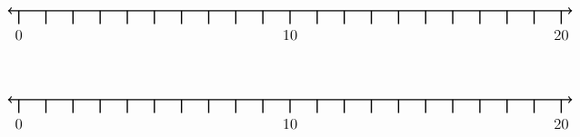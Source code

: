 \documentclass[leqno, 12pt]{article}
\begin{document}
\vspace{10pt}\begin{equation}
    \begin{tikzpicture}[scale=0.75, baseline={([yshift=-1pt]current bounding box.north)}]
        \draw[{To[scale=1.3]}-{To[scale=1.3]}, line width=1pt] (-0.4, 0) -- (20.4, 0);
        \foreach \x in {0,1,...,20}
            \draw[shift={(\x,0)},color=black, line width=1pt] (0pt,-14pt) -- (0pt,0pt);
        \foreach \x in {0,10,20}
            \draw[shift={(\x,-0.8)},color=black] node[font=\large,text height=12pt] {$\x$};
        \node [font=\large, minimum width=30mm] at (21,1.2) {$  $};
    \end{tikzpicture}
\end{equation}
\vspace{10pt}\begin{equation}
    \begin{tikzpicture}[scale=0.75, baseline={([yshift=-1pt]current bounding box.north)}]
        \draw[{To[scale=1.3]}-{To[scale=1.3]}, line width=1pt] (-0.4, 0) -- (20.4, 0);
        \foreach \x in {0,1,...,20}
            \draw[shift={(\x,0)},color=black, line width=1pt] (0pt,-14pt) -- (0pt,0pt);
        \foreach \x in {0,10,20}
            \draw[shift={(\x,-0.8)},color=black] node[font=\large,text height=12pt] {$\x$};
        \node [font=\large, minimum width=30mm] at (21,1.2) {$  $};
    \end{tikzpicture}
\end{equation}
\vspace{10pt}
\end{document}
